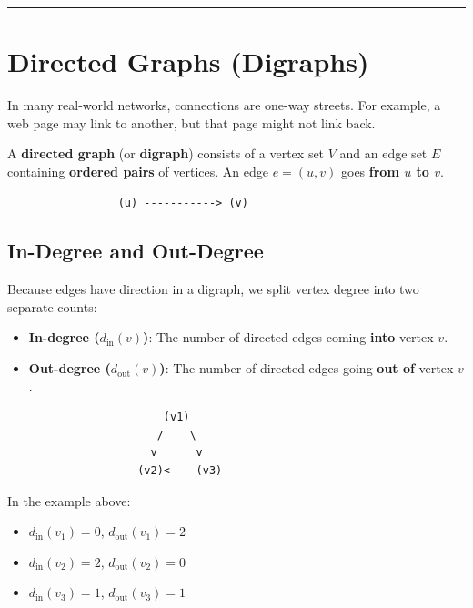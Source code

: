 \documentclass[
]{book}
\providecommand{\tightlist}{%
  \setlength{\itemsep}{0pt}\setlength{\parskip}{0pt}}
\theoremstyle{definition}
\theoremstyle{definition}
\theoremstyle{definition}
\theoremstyle{definition}
\theoremstyle{remark}
\begin{document}
\begin{center}\rule{0.5\linewidth}{0.5pt}\end{center}

\section{Directed Graphs (Digraphs)}\label{directed-graphs-digraphs}

In many real-world networks, connections are one-way streets. For example, a web page may link to another, but that page might not link back.

A \textbf{directed graph} (or \textbf{digraph}) consists of a vertex set \(V\) and an edge set \(E\) containing \textbf{ordered pairs} of vertices. An edge \(e = (u, v)\) goes \textbf{from \(u\) to \(v\)}.

\begin{verbatim}
                 (u) -----------> (v)
\end{verbatim}

\subsection{In-Degree and Out-Degree}\label{in-degree-and-out-degree}

Because edges have direction in a digraph, we split vertex degree into two separate counts:

\begin{itemize}
\tightlist
\item
  \textbf{In-degree (\(d_{\text{in}}(v)\))}: The number of directed edges coming \textbf{into} vertex \(v\).
\item
  \textbf{Out-degree (\(d_{\text{out}}(v)\))}: The number of directed edges going \textbf{out of} vertex \(v\).
\end{itemize}

\begin{verbatim}
                        (v1)
                       /    \
                      v      v
                    (v2)<----(v3)
\end{verbatim}

In the example above:

\begin{itemize}
\tightlist
\item
  \(d_{\text{in}}(v_1) = 0\), \(d_{\text{out}}(v_1) = 2\)
\item
  \(d_{\text{in}}(v_2) = 2\), \(d_{\text{out}}(v_2) = 0\)
\item
  \(d_{\text{in}}(v_3) = 1\), \(d_{\text{out}}(v_3) = 1\)
\end{itemize}
\end{document}
